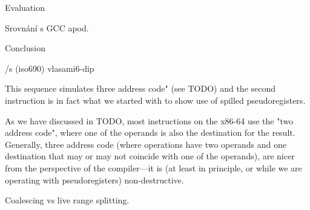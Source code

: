 %
%
%
%
%
%
%
%
%
%
%
%
%
%
%
%

\chap Evaluation

Srovnání s GCC apod.

\chap Conclusion

\bibchap
\usebib/s (iso690) vlasami6-dip

\bye

This sequence simulates \"three address code" (see TODO) and the second instruction
is in fact what we started with to show use of spilled pseudoregisters.


As we have discussed in TODO, most instructions on
the x86-64 use the "two address code", where one of the operands is also the
destination for the result. Generally, three address code (where operations have
two operands and one destination that may or may not coincide with one of the
operands), are nicer from the perspective of the compiler---it is (at least in
principle, or while we are operating with pseudoregisters) non-destructive.





Coalescing vs live range splitting.



%

